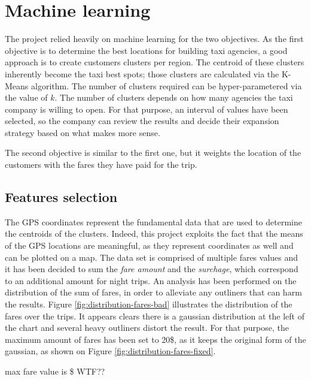 \documentclass[a4paper]{article}
\begin{document}
\section{Machine learning}
The project relied heavily on machine learning for the two objectives. As the first objective is to determine the best locations for building taxi agencies, a good approach is to create customers clusters per region. The centroid of these clusters inherently become the taxi best spots; those clusters are calculated via the K-Means algorithm. The number of clusters required can be hyper-parametered via the value of $k$. The number of clusters depends on how many agencies the taxi company is willing to open. For that purpose, an interval of values have been selected, so the company can review the results and decide their expansion strategy based on what makes more sense.

The second objective is similar to the first one, but it weights the location of the customers with the fares they have paid for the trip.



\subsection{Features selection}
The GPS coordinates represent the fundamental data that are used to determine the centroids of the clusters. Indeed, this project exploits the fact that the means of the GPS locations are meaningful, as they represent coordinates as well and can be plotted on a map. The data set is comprised of multiple fares values and it has been decided to sum the \emph{fare amount} and the \emph{surchage}, which correspond to an additional amount for night trips. An analysis has been performed on the distribution of the sum of fares, in order to alleviate any outliners that can harm the results. Figure \ref{fig:distribution-fares-bad} illustrates the distribution of the fares over the trips. It appears clears there is a gaussian distribution at the left of the chart and several heavy outliners distort the result. For that purpose, the maximum amount of fares has been set to 20\$, as it keeps the original form of the gaussian, as shown on Figure \ref{fig:distribution-fares-fixed}.

max fare value is \$ WTF?? 
\end{document}
